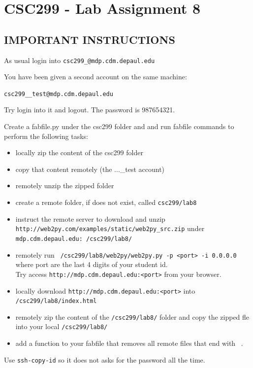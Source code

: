 \documentclass[12pt]{article}
\begin{document}
\section{CSC299 - Lab Assignment 8}

\subsection*{IMPORTANT INSTRUCTIONS}

\noindent 
As usual login into {\tt csc299\_<your student id>@mdp.cdm.depaul.edu}

\noindent You have been given a second account on the same machine:

{\tt csc299\_<your student id>\_test@mdp.cdm.depaul.edu} 

Try login into it and logout. The password is 987654321.

\noindent Create a fabfile.py under the csc299 folder and and run fabfile commands to perform the following tasks:

\begin{itemize}
\item locally zip the content of the csc299 folder
\item copy that content remotely (the  ...\_test account)
\item remotely unzip the zipped folder
\item create a remote folder, if does not exist, called {\tt csc299/lab8}
\item instruct the remote server to download and unzip\\
{\tt http://web2py.com/examples/static/web2py\_src.zip} under\\
 {\tt mdp.cdm.depaul.edu:~/csc299/lab8/}
\item remotely run {\tt ~/csc299/lab8/web2py/web2py.py -p <port> -i 0.0.0.0} where port are the last 4 digits of your student id.\\
Try access {\tt http://mdp.cdm.depaul.edu:<port>} from your browser.
\item locally download {\tt http://mdp.cdm.depaul.edu:<port>} into\\{\tt /csc299/lab8/index.html}
\item remotely zip the content of the {\tt /csc299/lab8/} folder and copy the zipped fle into your local {\tt /csc299/lab8/}
\item add a function to your fabfile that removes all remote files that end with ~.
\end{itemize}

Use {\tt ssh-copy-id} so it does not asks for the password all the time.
\end{document}
